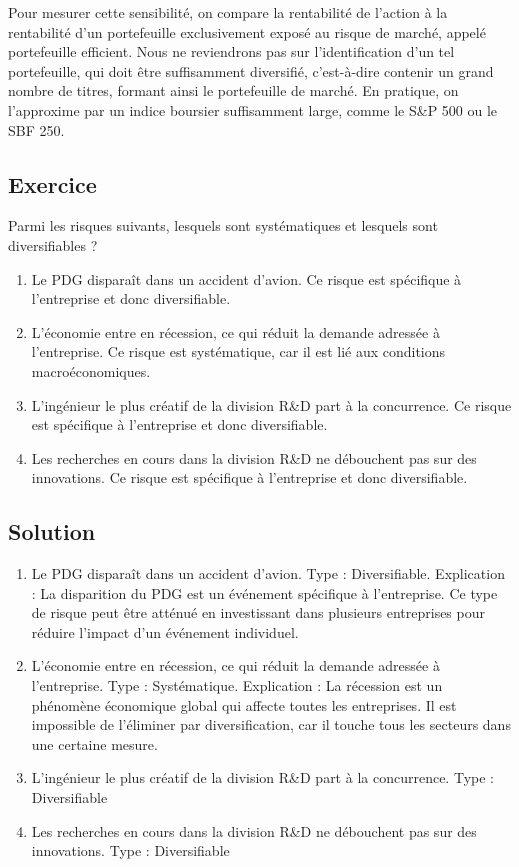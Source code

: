 \documentclass[a4paper, 12pt]{report}
\begin{document}
Pour mesurer cette sensibilité, on compare la rentabilité de l'action à la rentabilité d'un portefeuille exclusivement exposé au risque de marché, appelé portefeuille efficient. Nous ne reviendrons pas sur l'identification d'un tel portefeuille, qui doit être suffisamment diversifié, c'est-à-dire contenir un grand nombre de titres, formant ainsi le portefeuille de marché. En pratique, on l'approxime par un indice boursier suffisamment large, comme le S\&P 500 ou le SBF 250.

\subsection{Exercice}

Parmi les risques suivants, lesquels sont systématiques et lesquels sont diversifiables ?

\begin{enumerate}
	\item Le PDG disparaît dans un accident d'avion. Ce risque est spécifique à l'entreprise et donc diversifiable.
	\item L'économie entre en récession, ce qui réduit la demande adressée à l'entreprise. Ce risque est systématique, car il est lié aux conditions macroéconomiques.
	\item L'ingénieur le plus créatif de la division R\&D part à la concurrence. Ce risque est spécifique à l'entreprise et donc diversifiable.
	\item Les recherches en cours dans la division R\&D ne débouchent pas sur des innovations. Ce risque est spécifique à l'entreprise et donc diversifiable.
\end{enumerate}

\subsection{Solution}

\begin{enumerate}
	\item Le PDG disparaît dans un accident d'avion. Type : Diversifiable. Explication : La disparition du PDG est un événement spécifique à l'entreprise. Ce type de risque peut être atténué en investissant dans plusieurs entreprises pour réduire l'impact d'un événement individuel.
	\item L'économie entre en récession, ce qui réduit la demande adressée à l'entreprise. Type : Systématique. Explication : La récession est un phénomène économique global qui affecte toutes les entreprises. Il est impossible de l'éliminer par diversification, car il touche tous les secteurs dans une certaine mesure.
	\item L'ingénieur le plus créatif de la division R\&D part à la concurrence. Type : Diversifiable
	\item Les recherches en cours dans la division R\&D ne débouchent pas sur des innovations. Type : Diversifiable
\end{enumerate}
\end{document}

